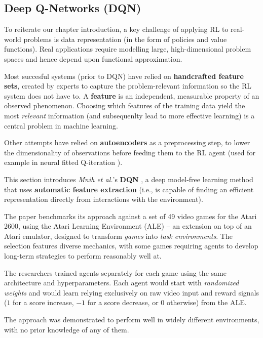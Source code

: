 \subsection{Deep Q-Networks (DQN)} \label{section:dqn}
To reiterate our chapter introduction, a key challenge of applying RL to real-world problems is data representation (in the form of policies and value functions).
Real applications require modelling large, high-dimensional problem spaces and hence depend upon functional approximation.

Most succesful systems (prior to DQN) have relied on \textbf{handcrafted feature sets}, created by experts to capture the problem-relevant information so the RL system does not have to.
A \textbf{feature} is an independent, measurable property of an observed phenomenon.
Choosing which features of the training data yield the most \emph{relevant} information (and subsequenlty lead to more effective learning) is a central problem in machine learning.

Other attempts have relied on \textbf{autoencoders}\footnotemark{} as a preprocessing step, to lower the dimensionality of observations before feeding them to the RL agent (used for example in neural fitted Q-iteration \cite{neural-q-fitted}).

This section introduces \emph{Mnih et al.}'s \textbf{DQN} \cite{atari-dqn}, a deep model-free learning method that uses \textbf{automatic feature extraction} (i.e., is capable of finding an efficient representation directly from interactions with the environment).

The paper benchmarks its approach against a set of 49 video games for the Atari 2600, using the Atari Learning Environment (ALE) \cite{ale-paper} -- an extension on top of an Atari emulator, designed to transform \emph{games} into \emph{task environments}.
The selection features diverse mechanics, with some games requiring agents to develop long-term strategies to perform reasonably well at.

The researchers trained agents separately for each game using the same architecture and hyperparameters.
Each agent would start with \emph{randomized weights} and would learn relying exclusively on raw video input and reward signals ($1$ for a score increase, $-1$ for a score decrease, or $0$ otherwise) from the ALE.

The approach was demonstrated to perform well in widely different environments, with no prior knowledge of any of them.

